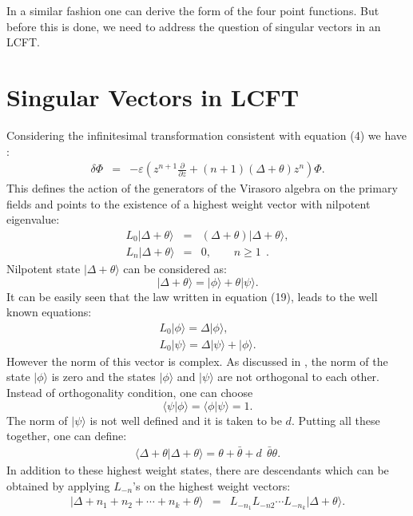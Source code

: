 \documentclass[a4paper,11pt]{article}
\begin{document}
In a similar fashion one can derive the form of the four point
functions. But before this is done, we need to address the
question of singular vectors in an LCFT.
\section{Singular Vectors in LCFT}
Considering the infinitesimal transformation consistent with
equation (4) we have :
\begin{eqnarray}
\delta\Phi&=&-\varepsilon (z^{n+1}\frac{\partial}{\partial
z}+(n+1)(\Delta+\theta)z^{n})\Phi .
\end{eqnarray}
This defines the action of the generators of the Virasoro algebra
on the primary fields and points to the existence of a highest
weight vector with nilpotent eigenvalue:
\begin{eqnarray}
L_{0}|\Delta+\theta\rangle&=&(\Delta+\theta)|\Delta+\theta\rangle ,\nonumber\\
L_{n}|\Delta+\theta\rangle&=&0,\:\:\:\:\:\:\:\:\:n\geq1\:\:.
\end{eqnarray}
Nilpotent state $|\Delta+\theta\rangle$ can be considered as:
\begin{equation}
|\Delta+\theta\rangle=|\phi \rangle+ \theta | \psi \rangle .
\end{equation}
It can be easily seen that the law written in equation (19), leads
to the well known equations:
\begin{eqnarray}
L_{0}|\phi\rangle=\Delta|\phi\rangle ,\nonumber\\
L_{0}|\psi\rangle=\Delta|\psi\rangle+|\phi\rangle .
\end{eqnarray}
However the norm of this vector is complex. As discussed in
\cite{Kogan}, the norm of the state $|\phi\rangle$ is zero and
the states $|\phi\rangle$ and $|\psi\rangle$ are not orthogonal to
each other. Instead of orthogonality condition, one can choose
\begin{equation}
\langle\psi|\phi\rangle = \langle\phi|\psi\rangle =1 .
\end{equation}
The norm of $|\psi\rangle$ is not well defined and it is taken to
be $ d $. Putting all these together, one can define:
\begin{eqnarray}
\langle\Delta+\theta|\Delta+\theta\rangle=\theta+
\bar{\theta}+d\:\: \bar{\theta}\theta .
\end{eqnarray}
In addition to these highest weight states, there are descendants
which can be obtained by applying $L_{-n}$'s on the highest
weight vectors:
\begin{eqnarray}
|\Delta+n_{1}+n_{2}+\cdots +n_{k}+\theta\rangle &=&
L_{-n_{1}}L_{-n{2}}\cdots L_{-n_{k}}|\Delta+\theta\rangle.
\end{eqnarray}
\end{document}
